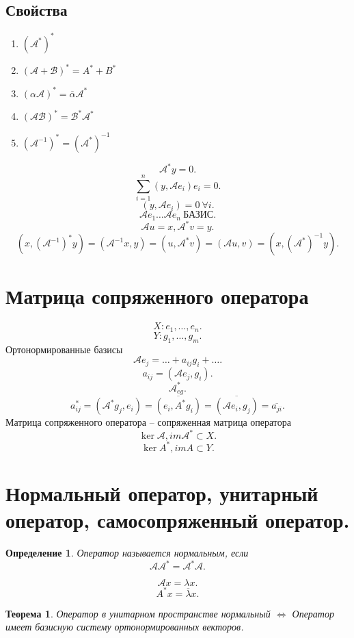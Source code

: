 \documentclass{scrartcl}
\newtheorem{theorem}{Теорема}
\newtheorem{definition}{Определение}
\begin{document}
\subsection{Свойства}
\begin{enumerate}
    \item $(\mathcal{A}^{*})^{*}$
    \item $ (\mathcal{A} + \mathcal{B})^{*} = A^{*} + B^{*}$ 
    \item $(\alpha \mathcal{A})^{*} = \overline{\alpha} \mathcal{A}^{*}$ 
    \item $(\mathcal{A} \mathcal{B})^{*} = \mathcal{B}^{*} \mathcal{A}^{*}$ 
    \item $(\mathcal{A}^{-1})^{*} = (\mathcal{A}^{*})^{-1}$
\end{enumerate}
\[
    \mathcal{A}^{*} y = 0
.\] 
\[
    \sum_{i = 1}^{n} (y,\mathcal{A} e_{i}) e_{i} = 0
.\] 
\[
    (y,\mathcal{A} e_{i}) = 0 ~ \forall i
.\] 
\[
    \mathcal{A}e_1 \dots \mathcal{A}e_{n} ~\text{БАЗИС}
.\] 
\[
    \mathcal{A} u = x, \mathcal{A}^{*} v = y
.\] 
\[
    (x,(\mathcal{A}^{-1})^{*}y) = (\mathcal{A}^{-1}x,y) = (u,\mathcal{A}^{*}v) =
    (\mathcal{A} u ,v) = (x,(\mathcal{A}^{*})^{-1} y )
.\] 
\section{Матрица сопряженного оператора}
\[
X:e_1,\dots,e_{n}
.\] 
\[
Y:g_1,\dots,g_{m}
.\] 
Ортонормированные базисы
\[
    \mathcal{A} e_{j} = \dots + a_{ij} g_{i} + \dots
.\] 
\[
    a_{ij} = (\mathcal{A} e_{j},g_{i})
.\] 
\[
    \mathcal{A}^{*}_{eg}
.\] 
\[
    a^{*}_{ij} = (\mathcal{A}^{*} g_{j},e_{i}) = \overline{(e_{i},A^{*} g_{i})} =
    \overline{(\mathcal{A} e_{i},g_{j})} = \overline{a_{ji}}
.\] 
Матрица сопряженного оператора -- сопряженная матрица оператора
\[
    \ker \mathcal{A}, im \mathcal{A} ^{*} \subset X
.\] 
\[
\ker A^{*},im A \subset Y
.\] 
\section{Нормальный оператор, унитарный оператор, самосопряженный оператор.}
\begin{definition}
    Оператор называется нормальным, если
    \[
        \mathcal{A} \mathcal{A}^{*} = \mathcal{A}^{*} \mathcal{A}
    .\] 
\end{definition}
\[
    \mathcal{A}x = \lambda x
.\] 
\[
A^{*}x = \overline{\lambda} x
.\] 
\begin{theorem}
    Оператор в унитарном пространстве нормальный $\iff$
    Оператор имеет базисную систему ортонормированных векторов. 
\end{theorem}
\end{document}
